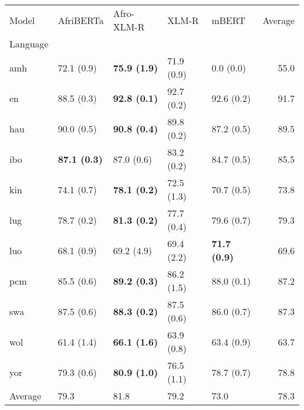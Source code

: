\begin{tabular}{lllllr}
\toprule
Model &            AfriBERTa &           Afro-XLM-R &       XLM-R &                mBERT & Average \\
Language &                      &                      &             &                      &         \\
\midrule
amh      &           72.1 (0.9) &  \textbf{75.9 (1.9)} &  71.9 (0.9) &            0.0 (0.0) &    55.0 \\
en       &           88.5 (0.3) &  \textbf{92.8 (0.1)} &  92.7 (0.2) &           92.6 (0.2) &    91.7 \\
hau      &           90.0 (0.5) &  \textbf{90.8 (0.4)} &  89.8 (0.2) &           87.2 (0.5) &    89.5 \\
ibo      &  \textbf{87.1 (0.3)} &           87.0 (0.6) &  83.2 (0.2) &           84.7 (0.5) &    85.5 \\
kin      &           74.1 (0.7) &  \textbf{78.1 (0.2)} &  72.5 (1.3) &           70.7 (0.5) &    73.8 \\
lug      &           78.7 (0.2) &  \textbf{81.3 (0.2)} &  77.7 (0.4) &           79.6 (0.7) &    79.3 \\
luo      &           68.1 (0.9) &           69.2 (4.9) &  69.4 (2.2) &  \textbf{71.7 (0.9)} &    69.6 \\
pcm      &           85.5 (0.6) &  \textbf{89.2 (0.3)} &  86.2 (1.5) &           88.0 (0.1) &    87.2 \\
swa      &           87.5 (0.6) &  \textbf{88.3 (0.2)} &  87.5 (0.6) &           86.0 (0.7) &    87.3 \\
wol      &           61.4 (1.4) &  \textbf{66.1 (1.6)} &  63.9 (0.8) &           63.4 (0.9) &    63.7 \\
yor      &           79.3 (0.6) &  \textbf{80.9 (1.0)} &  76.5 (1.1) &           78.7 (0.7) &    78.8 \\
\midrule
Average  &                 79.3 &                 81.8 &        79.2 &                 73.0 &    78.3 \\
\bottomrule
\end{tabular}
